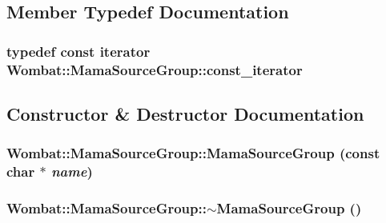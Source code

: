 \subsection{Member Typedef Documentation}
\hypertarget{classWombat_1_1MamaSourceGroup_a65cb4cd84b8161cb0848a4cb28e53311}{
\subsubsection[{const\_\-iterator}]{\setlength{\rightskip}{0pt plus 5cm}typedef const {\bf iterator} {\bf Wombat::MamaSourceGroup::const\_\-iterator}}}
\label{classWombat_1_1MamaSourceGroup_a65cb4cd84b8161cb0848a4cb28e53311}


\subsection{Constructor \& Destructor Documentation}
\hypertarget{classWombat_1_1MamaSourceGroup_a96db61f1a68dd6ff099f9c893efa0d0a}{
\subsubsection[{MamaSourceGroup}]{\setlength{\rightskip}{0pt plus 5cm}Wombat::MamaSourceGroup::MamaSourceGroup (const char $\ast$ {\em name})}}
\label{classWombat_1_1MamaSourceGroup_a96db61f1a68dd6ff099f9c893efa0d0a}
\hypertarget{classWombat_1_1MamaSourceGroup_a758752626dc0eb5373df787974f5371b}{
\subsubsection[{$\sim$MamaSourceGroup}]{\setlength{\rightskip}{0pt plus 5cm}Wombat::MamaSourceGroup::$\sim$MamaSourceGroup ()}}
\label{classWombat_1_1MamaSourceGroup_a758752626dc0eb5373df787974f5371b}


